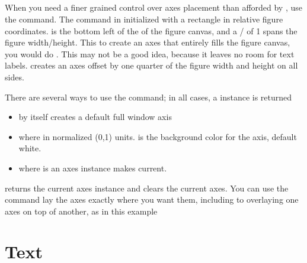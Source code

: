 \documentclass[twoside]{book}
\begin{document}


\subsection{}
\label{sec:axes}

When you need a finer grained control over axes placement than
afforded by , use the  command.  The
 command in initialized with a rectangle  in relative figure coordinates.   is the bottom left of the of the figure canvas, and
a / of 1 spans the figure width/height.  This to create an
axes that entirely fills the figure canvas, you would do .  This may not be a good idea, because it leaves no room
for text labels.   creates an axes
offset by one quarter of the figure width and height on all sides.


There are several ways to use the  command; in all cases, a
 instance is returned

\begin{itemize}
\item {} by itself creates a default full
   window axis
  \item {} where  in normalized (0,1) units.   is the
    background color for the axis, default white.
  \item {} where  is an axes instance makes
   current.
\end{itemize}

\noindent {} returns the current axes instance and 
clears the current axes.  You can use the  command lay the
axes exactly where you want them, including to overlaying one axes on
top of another, as in this example





      
\section{Text}
\label{sec:text}
\end{document}
